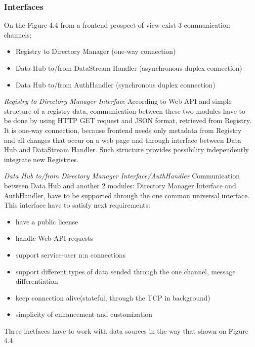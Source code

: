     \subsubsection{Interfaces}
      On the Figure 4.4 from a frontend prospect of view exist 3 communication channels: 
      \begin{itemize}
      \item Registry to Directory Manager (one-way connection)
      \item Data Hub to/from DataStream Handler (asynchronous duplex connection) 
      \item Data Hub to/from AuthHandler (synchronous duplex connection) 
      \end{itemize}

      \emph{Registry to Directory Manager Interface}
      \newline
      According to Web API and simple structure of a registry data, communication between these two modules have to be done by using HTTP GET request and JSON format, retrieved from Registry. It is one-way connection, because frontend needs only metadata from Registry and all changes that occur on a web page and through interface between Data Hub and DataStream Handler. Such structure provides possibility independently integrate new Registries.

      \emph{Data Hub to/from Directory Manager Interface/AuthHandler}
      \newline
      Communication between Data Hub and another 2 modules: Directory Manager Interface and AuthHandler, have to be supported through the one common universal interface. This interface have to satisfy next requirements:
      \begin{itemize}
      \item have a public license
      \item handle Web API requests
      \item support service-user n:n connections
      \item support different types of data sended through the one channel, message differentiation
      \item keep connection alive(stateful, through the TCP in background)
      \item simplicity of enhancement and customization
      \end{itemize}

      Three inetfaces have to work with data sources in the way that shown on Figure 4.4

